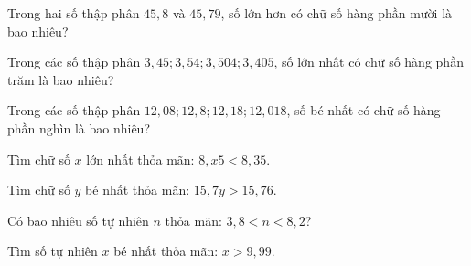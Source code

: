
\begin{ex}
  Trong hai số thập phân $45{,}8$ và $45{,}79$, số lớn hơn có chữ số hàng phần mười là bao nhiêu?
\end{ex}

\begin{ex}
  Trong các số thập phân $3{,}45; 3{,}54; 3{,}504; 3{,}405$, số lớn nhất có chữ số hàng phần trăm là bao nhiêu?
\end{ex}

\begin{ex}
  Trong các số thập phân $12{,}08; 12{,}8; 12{,}18; 12{,}018$, số bé nhất có chữ số hàng phần nghìn là bao nhiêu?
\end{ex}

\begin{ex}
  Tìm chữ số $x$ lớn nhất thỏa mãn: $8{,}x5 < 8{,}35$.
\end{ex}

\begin{ex}
  Tìm chữ số $y$ bé nhất thỏa mãn: $15{,}7y > 15{,}76$.
\end{ex}

\begin{ex}
  Có bao nhiêu số tự nhiên $n$ thỏa mãn: $3{,}8 < n < 8{,}2$?
\end{ex}

\begin{ex}
  Tìm số tự nhiên $x$ bé nhất thỏa mãn: $x > 9{,}99$.
\end{ex}

